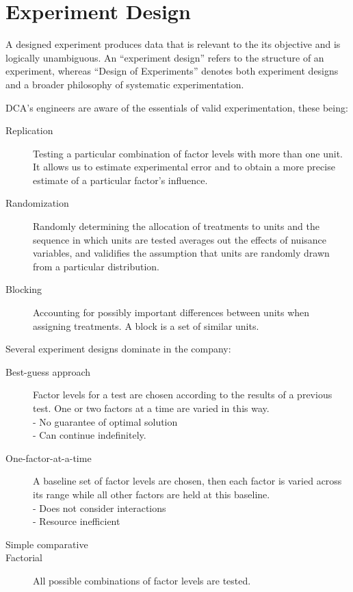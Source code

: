 \documentclass[11pt,a4paper,article]{memoir} %
\begin{document}
\section{Experiment Design}
A designed experiment produces data that is relevant to the its objective and is logically unambiguous. An ``experiment design'' refers to the structure of an experiment, whereas ``Design of Experiments'' denotes both experiment designs and a broader philosophy of systematic experimentation.
\par
DCA's engineers are aware of the essentials of valid experimentation, these being:
\begin{description}
\item[Replication]{Testing a particular combination of factor levels with more than one unit. It allows us to estimate experimental error and to obtain a more precise estimate of a particular factor's influence.}
\item[Randomization]{Randomly determining the allocation of treatments to units and the sequence in which units are tested averages out the effects of nuisance variables, and validifies the assumption that units are randomly drawn from a particular distribution.}
\item[Blocking]{Accounting for possibly important differences between units when assigning treatments. A block is a set of similar units.}
\end{description}
Several experiment designs dominate in the company: 
\begin{description}
\item[Best-guess approach]{Factor levels for a test are chosen according to the results of a previous test. One or two factors at a time are varied in this way. \\ - No guarantee of optimal solution \\ - Can continue indefinitely.}
\item[One-factor-at-a-time]{A baseline set of factor levels are chosen, then each factor is varied across its range while all other factors are held at this baseline.\\ - Does not consider interactions \\ - Resource inefficient}
\item[Simple comparative]{}
\item[Factorial]{All possible combinations of factor levels are tested.}
\end{description}
\end{document}
